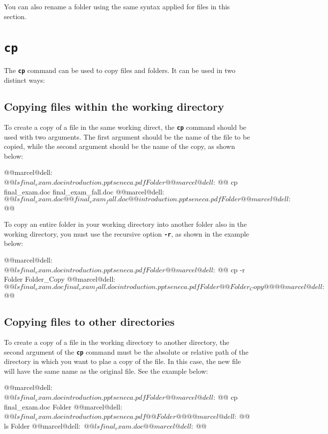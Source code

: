 You can also rename a folder using the same syntax applied for files in this section.

\section{\textbf{\texttt{cp}}}

The \textbf{\texttt{cp}} command can be used to copy files and folders. It can be used in two distinct ways:


\subsection{Copying files within the working directory}

To create a copy of a file in the same working direct, the \textbf{\texttt{cp}} command should be used with two arguments. The first argument should be the name of the file to be copied, while the second argument should be the name of the copy, as shown below:
\begin{command_line}[Bash]
@@marcel@dell:~$@@ ls
final_exam.doc  introduction.ppt  seneca.pdf
Folder
@@marcel@dell:~$@@ cp final_exam.doc final_exam_fall.doc
@@marcel@dell:~$@@ ls
final_exam.doc  @@final_exam_fall.doc@@  introduction.ppt
seneca.pdf  Folder
@@marcel@dell:~$@@
\end{command_line}

To copy an entire folder in your working directory into another folder also in the working directory, you must use the recursive option \textbf{\texttt{-r}}, as shown in the example below:
\begin{command_line}[Bash]
@@marcel@dell:~$@@ ls
final_exam.doc  introduction.ppt  seneca.pdf
Folder
@@marcel@dell:~$@@ cp -r Folder Folder_Copy
@@marcel@dell:~$@@ ls
final_exam.doc  final_exam_fall.doc  introduction.ppt
seneca.pdf  Folder  @@Folder_Copy@@
@@marcel@dell:~$@@
\end{command_line}

\subsection{Copying files to other directories}

To create a copy of a file in the working directory to another directory, the second argument of the \textbf{\texttt{cp}} command must be the absolute or relative path of the directory in which you want to plae a copy of the file. In this case, the new file will have the same name as the original file. See the example below:
\begin{command_line}[Bash]
@@marcel@dell:~$@@ ls
final_exam.doc  introduction.ppt  seneca.pdf
Folder
@@marcel@dell:~$@@ cp final_exam.doc Folder
@@marcel@dell:~$@@ ls
final_exam.doc  introduction.ppt  seneca.pdf
@@Folder@@
@@marcel@dell:~$@@ ls Folder
@@marcel@dell:~$@@ ls
final_exam.doc
@@marcel@dell:~$@@
\end{command_line}

